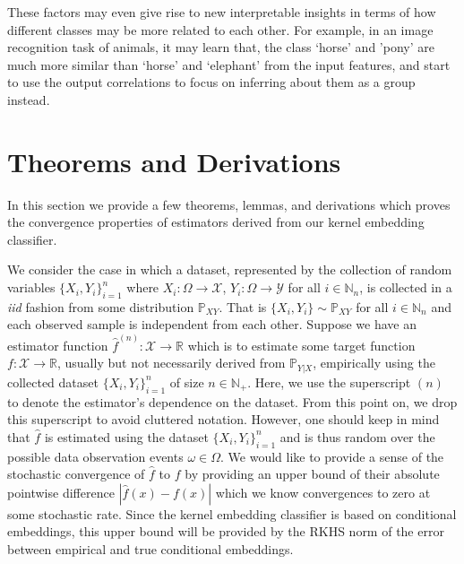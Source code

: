 \documentclass{article}
\begin{document}
\begin{itemize}
		These factors may even give rise to new interpretable insights in terms of how different classes may be more related to each other. For example, in an image recognition task of animals, it may learn that, the class `horse' and 'pony' are much more similar than `horse' and `elephant' from the input features, and start to use the output correlations to focus on inferring about them as a group instead.
		\end{itemize}
	
\small



\newpage
\appendix

\section{Theorems and Derivations}
\label{app:theorems_derivations}

	In this section we provide a few theorems, lemmas, and derivations which proves the convergence properties of estimators derived from our kernel embedding classifier.
	
	We consider the case in which a dataset, represented by the collection of random variables $\{X_{i}, Y_{i}\}_{i = 1}^{n}$ where $X_{i} : \Omega \to \mathcal{X}$,  $Y_{i} : \Omega \to \mathcal{Y}$ for all $i \in \mathbb{N}_{n}$, is collected in a \textit{iid} fashion from some distribution $\mathbb{P}_{X Y}$. That is $\{X_{i}, Y_{i}\} \sim \mathbb{P}_{X Y}$ for all $i \in \mathbb{N}_{n}$ and each observed sample is independent from each other. Suppose we have an estimator function $\hat{f}^{(n)} : \mathcal{X} \to \mathbb{R}$ which is to estimate some target function  $f : \mathcal{X} \to \mathbb{R}$, usually but not necessarily derived from $\mathbb{P}_{Y |X }$, empirically using the collected dataset $\{X_{i}, Y_{i}\}_{i = 1}^{n}$ of size $n \in \mathbb{N}_{+}$. Here, we use the superscript $(n)$ to denote the estimator's dependence on the dataset. From this point on, we drop this superscript to avoid cluttered notation. However, one should keep in mind that $\hat{f}$ is estimated using the dataset $\{X_{i}, Y_{i}\}_{i = 1}^{n}$ and is thus random over the possible data observation events $\omega \in \Omega$. We would like to provide a sense of the stochastic convergence of $\hat{f}$ to $f$ by providing an upper bound of their absolute pointwise difference $| \hat{f}(x) - f(x) |$ which we know convergences to zero at some stochastic rate. Since the kernel embedding classifier is based on conditional embeddings, this upper bound will be provided by the RKHS norm of the error between empirical and true conditional embeddings.
	
\end{document}
